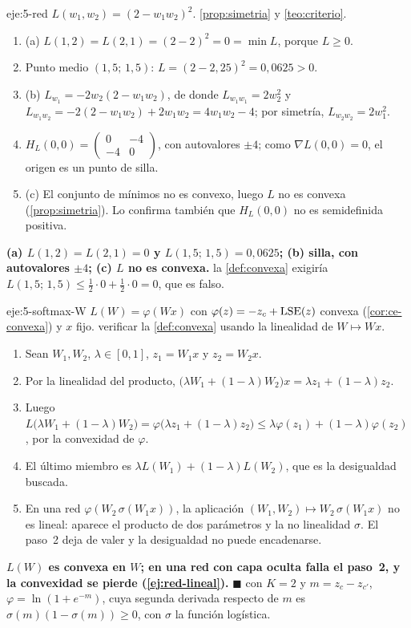 \begin{solucion}{eje:5-red}
\datos $L(w_1,w_2)=(2-w_1w_2)^{2}$.
\planteamiento \cref{prop:simetria} y \cref{teo:criterio}.
\pasos
\begin{enumerate}[label=\arabic*.]
  \item (a) $L(1,2)=L(2,1)=(2-2)^{2}=0=\min L$, porque $L\ge 0$.
  \item Punto medio $(1{,}5;\,1{,}5)$: $L=(2-2{,}25)^{2}=0{,}0625>0$.
  \item (b) $L_{w_1}=-2w_2(2-w_1w_2)$, de donde $L_{w_1w_1}=2w_2^{2}$ y $L_{w_1w_2}=-2(2-w_1w_2)+2w_1w_2=4w_1w_2-4$; por simetría, $L_{w_2w_2}=2w_1^{2}$.
  \item $H_L(0,0)=\begin{pmatrix}0&-4\\-4&0\end{pmatrix}$, con autovalores $\pm 4$; como $\nabla L(0,0)=0$, el origen es un punto de silla.
  \item (c) El conjunto de mínimos no es convexo, luego $L$ no es convexa (\cref{prop:simetria}). Lo confirma también que $H_L(0,0)$ no es semidefinida positiva.
\end{enumerate}
\resultado \textbf{(a) $L(1,2)=L(2,1)=0$ y $L(1{,}5;\,1{,}5)=0{,}0625$; (b) silla, con autovalores $\pm4$; (c) $L$ no es convexa.}
\comprobacion la \cref{def:convexa} exigiría $L(1{,}5;\,1{,}5)\le\tfrac12\cdot 0+\tfrac12\cdot 0=0$, que es falso.
\end{solucion}

\begin{solucion}{eje:5-softmax-W}
\datos $L(W)=\varphi(Wx)$ con $\varphi(z)=-z_c+\operatorname{LSE}(z)$ convexa (\cref{cor:ce-convexa}) y $x$ fijo.
\planteamiento verificar la \cref{def:convexa} usando la linealidad de $W\mapsto Wx$.
\pasos
\begin{enumerate}[label=\arabic*.]
  \item Sean $W_1,W_2$, $\lambda\in[0,1]$, $z_1=W_1x$ y $z_2=W_2x$.
  \item Por la linealidad del producto, $\bigl(\lambda W_1+(1-\lambda)W_2\bigr)x=\lambda z_1+(1-\lambda)z_2$.
  \item Luego $L\bigl(\lambda W_1+(1-\lambda)W_2\bigr)=\varphi\bigl(\lambda z_1+(1-\lambda)z_2\bigr)\le\lambda\varphi(z_1)+(1-\lambda)\varphi(z_2)$, por la convexidad de $\varphi$.
  \item El último miembro es $\lambda L(W_1)+(1-\lambda)L(W_2)$, que es la desigualdad buscada.
  \item En una red $\varphi(W_2\,\sigma(W_1x))$, la aplicación $(W_1,W_2)\mapsto W_2\,\sigma(W_1x)$ no es lineal: aparece el producto de dos parámetros y la no linealidad $\sigma$. El paso~2 deja de valer y la desigualdad no puede encadenarse.
\end{enumerate}
\resultado \textbf{$L(W)$ es convexa en $W$; en una red con capa oculta falla el paso~2, y la convexidad se pierde (\cref{ej:red-lineal}).} $\blacksquare$
\comprobacion con $K=2$ y $m=z_c-z_{c'}$, $\varphi=\ln(1+e^{-m})$, cuya segunda derivada respecto de $m$ es $\sigma(m)(1-\sigma(m))\ge 0$, con $\sigma$ la función logística.
\end{solucion}

